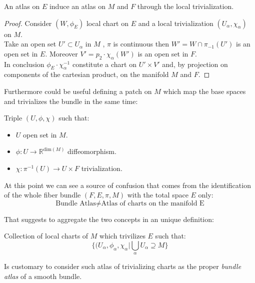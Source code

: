 \documentclass[a4paper,12pt]{scrartcl}    %
\begin{document}
\begin{proposition}
An atlas on $E$ induce an atlas on $M$ and $F$ through the local trivialization.
\end{proposition}
\begin{proof}
Consider $(W, \phi_{E})$ local chart on $E$ and a local trivialization $(U_{\alpha}, \chi_{\alpha})$ on $M$.
\\
Take an open set $U' \subset U_{\alpha}$ in $M$ , $\pi$ is continuous then $W' = W \cap \pi_{-1}(U')$ is an open set in $E$. Moreover $V'= p_{2} \cdot \chi_{\alpha} ( W')$ is an open set in $F$.
\\ 
In conclusion $\phi_{E} \cdot \chi_{\alpha}^{-1}$ constitute a chart on $U' \times V'$ and, by projection on components of the cartesian product, on the manifold $M$ and $F$.
\end{proof}
Furthermore could be useful defining a patch on $M$ which map the base spaces and trivializes the bundle in the same time:
\begin{definition}
Triple $(U, \phi, \chi)$ such that:
\begin{itemize}
\item $U$ open set in $M$.
\item $\phi: U \rightarrow \mathbb{R}^{\textrm{dim}(M)}$ diffeomorphism.
\item $\chi: \pi^{-1}(U) \rightarrow U \times F $ trivialization. 
\end{itemize}
\end{definition}

\begin{observation}
At this point we can see a source of confusion that comes from the identification of the whole fiber bundle $(F,E,\pi,M)$ with the total space $E$ only:
$$ \textrm{Bundle Atlas} \neq \textrm{Atlas of charts on the manifold E}$$
\end{observation}

That suggests to aggregate the two concepts in an unique definition:
\begin{definition}\label{Def: TrivializatingAtlas}
Collection of local charts of $M$ which trivilizes $E$ such that:
\begin{displaymath}
\big\{ (U_{\alpha}, \phi_{\alpha}, \chi_{\alpha} \vert \bigcup_{\alpha} U_{\alpha} \supseteq M   \big\}
\end{displaymath}
\end{definition}

\begin{notationfix}
Is customary to consider such atlas of trivializing charts as the proper \emph{bundle atlas} of a smooth bundle.
\end{notationfix}
\end{document}
